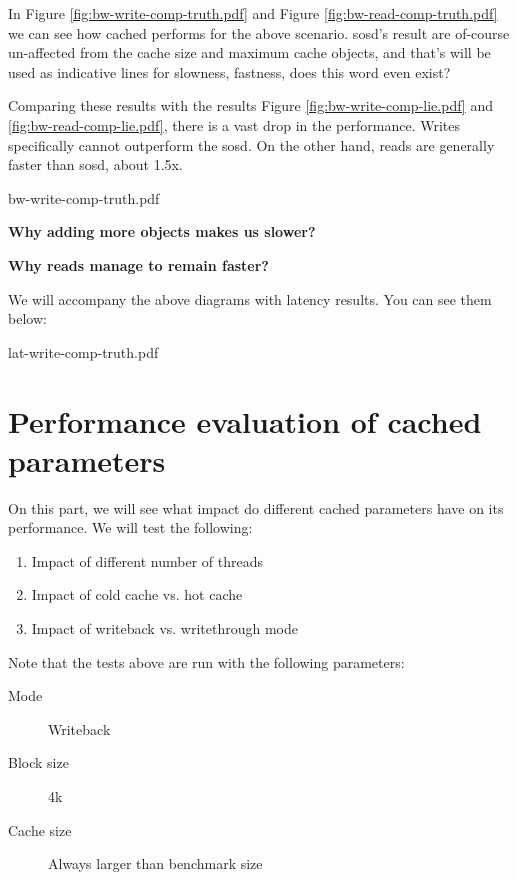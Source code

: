 In Figure \ref{fig:bw-write-comp-truth.pdf} and Figure 
\ref{fig:bw-read-comp-truth.pdf} we can see how cached performs for the above 
scenario. sosd's result are of-course un-affected from the cache size and 
maximum cache objects, and that's will be used as indicative lines for 
slowness, fastness, does this word even exist?

Comparing these results with the results Figure \ref{fig:bw-write-comp-lie.pdf} 
and \ref{fig:bw-read-comp-lie.pdf}, there is a vast drop in the performance. 
Writes specifically cannot outperform the sosd. On the other hand, reads are 
generally faster than sosd, about 1.5x.

{bw-write-comp-truth.pdf}

\textbf{Why adding more objects makes us slower?}

\textbf{Why reads manage to remain faster?}

We will accompany the above diagrams with latency results. You can see them 
below:

{lat-write-comp-truth.pdf}


\section{Performance evaluation of cached parameters}

On this part, we will see what impact do different cached parameters have on 
its performance. We will test the following:

\begin{enumerate}
	\item Impact of different number of threads
	\item Impact of cold cache vs. hot cache
	\item Impact of writeback vs. writethrough mode
\end{enumerate}

Note that the tests above are run with the following parameters:

\begin{description}
	\item[Mode] Writeback
	\item[Block size] 4k
	\item[Cache size] Always larger than benchmark size
\end{description}

